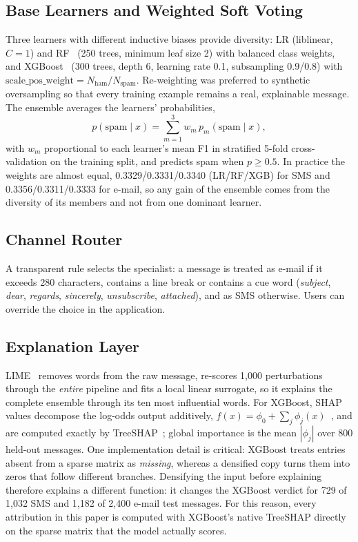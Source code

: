 \documentclass[conference]{IEEEtran}
\begin{document}
\subsection{Base Learners and Weighted Soft Voting}

Three learners with different inductive biases provide diversity: LR
(liblinear, $C=1$) and RF~\cite{breiman2001random} (250 trees, minimum leaf
size 2) with balanced class weights, and XGBoost~\cite{chen2016xgboost} (300
trees, depth 6, learning rate 0.1, subsampling 0.9/0.8) with
$\mathrm{scale\_pos\_weight}=N_{\text{ham}}/N_{\text{spam}}$. Re-weighting was
preferred to synthetic oversampling so that every training example remains a
real, explainable message. The ensemble averages the learners' probabilities,
\begin{equation}
  p(\text{spam}\mid x)=\sum_{m=1}^{3} w_m\,p_m(\text{spam}\mid x),
  \label{eq:ensemble}
\end{equation}
with $w_m$ proportional to each learner's mean F1 in stratified 5-fold
cross-validation on the training split, and predicts spam when $p\ge0.5$. In practice the
weights are almost equal, 0.3329/0.3331/0.3340 (LR/RF/XGB) for SMS and
0.3356/0.3311/0.3333 for e-mail, so any gain of the ensemble comes from the
diversity of its members and not from one dominant learner.

\subsection{Channel Router}

A transparent rule selects the specialist: a message is treated as e-mail if
it exceeds 280 characters, contains a line break or contains a cue word
(\emph{subject}, \emph{dear}, \emph{regards}, \emph{sincerely},
\emph{unsubscribe}, \emph{attached}), and as SMS otherwise. Users can override
the choice in the application.

\subsection{Explanation Layer}

LIME~\cite{ribeiro2016lime} removes words from the raw message, re-scores
1,000 perturbations through the \emph{entire} pipeline and fits a local linear
surrogate, so it explains the complete ensemble through its ten most
influential words. For XGBoost, SHAP values decompose the log-odds output
additively, $f(x)=\phi_0+\sum_j\phi_j(x)$~\cite{lundberg2017shap}, and are
computed exactly by TreeSHAP~\cite{lundberg2020treeshap}; global importance is
the mean $|\phi_j|$ over 800 held-out messages. One implementation detail is
critical: XGBoost treats entries absent from a sparse matrix as
\emph{missing}, whereas a densified copy turns them into zeros that follow
different branches. Densifying the input before explaining therefore explains
a different function: it changes the XGBoost verdict for 729 of 1,032 SMS and
1,182 of 2,400 e-mail test messages. For this reason, every
attribution in this paper is computed with XGBoost's native TreeSHAP directly
on the sparse matrix that the model actually scores.
\end{document}
